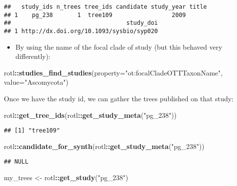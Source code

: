 \documentclass[]{article}
\newenvironment{Shaded}{\begin{snugshade}}{\end{snugshade}}
\newcommand{\DataTypeTok}[1]{\textcolor[rgb]{0.13,0.29,0.53}{#1}}
\newcommand{\KeywordTok}[1]{\textcolor[rgb]{0.13,0.29,0.53}{\textbf{#1}}}
\newcommand{\NormalTok}[1]{#1}
\newcommand{\OperatorTok}[1]{\textcolor[rgb]{0.81,0.36,0.00}{\textbf{#1}}}
\newcommand{\StringTok}[1]{\textcolor[rgb]{0.31,0.60,0.02}{#1}}
\providecommand{\tightlist}{%
  \setlength{\itemsep}{0pt}\setlength{\parskip}{0pt}}
\begin{document}
\begin{verbatim}
##   study_ids n_trees tree_ids candidate study_year title
## 1    pg_238       1  tree109                 2009      
##                                 study_doi
## 1 http://dx.doi.org/10.1093/sysbio/syp020
\end{verbatim}

\begin{itemize}
\tightlist
\item
  By using the name of the focal clade of study (but this behaved very differently):
\end{itemize}

\begin{Shaded}
\begin{Highlighting}[]
\NormalTok{rotl}\OperatorTok{::}\KeywordTok{studies_find_studies}\NormalTok{(}\DataTypeTok{property=}\StringTok{"ot:focalCladeOTTTaxonName"}\NormalTok{, }\DataTypeTok{value=}\StringTok{"Ascomycota"}\NormalTok{)}
\end{Highlighting}
\end{Shaded}

Once we have the study id, we can gather the trees published on that study:

\begin{Shaded}
\begin{Highlighting}[]
\NormalTok{rotl}\OperatorTok{::}\KeywordTok{get_tree_ids}\NormalTok{(rotl}\OperatorTok{::}\KeywordTok{get_study_meta}\NormalTok{(}\StringTok{"pg_238"}\NormalTok{))}
\end{Highlighting}
\end{Shaded}

\begin{verbatim}
## [1] "tree109"
\end{verbatim}

\begin{Shaded}
\begin{Highlighting}[]
\NormalTok{rotl}\OperatorTok{::}\KeywordTok{candidate_for_synth}\NormalTok{(rotl}\OperatorTok{::}\KeywordTok{get_study_meta}\NormalTok{(}\StringTok{"pg_238"}\NormalTok{))}
\end{Highlighting}
\end{Shaded}

\begin{verbatim}
## NULL
\end{verbatim}

\begin{Shaded}
\begin{Highlighting}[]
\NormalTok{my_trees <-}\StringTok{ }\NormalTok{rotl}\OperatorTok{::}\KeywordTok{get_study}\NormalTok{(}\StringTok{"pg_238"}\NormalTok{)}
\end{Highlighting}
\end{Shaded}
\end{document}
